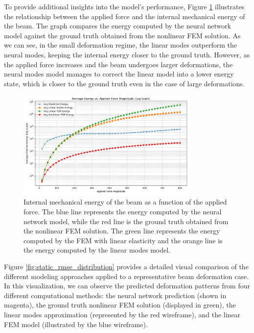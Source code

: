 To provide additional insights into the model's performance, Figure \ref{fig:static_energy_beam} illustrates the relationship between the applied force and the internal mechanical energy of the beam. The graph compares the energy computed by the neural network model against the ground truth obtained from the nonlinear FEM solution. As we can see, in the small deformation regime, the linear modes outperform the neural modes, keeping the internal energy closer  to the ground truth. However, as the applied force increases and the beam undergoes larger deformations, the neural modes model manages to correct the linear model into a lower energy state, which is closer to the ground truth even in the case of large deformations. 
\begin{figure}[H]
    \centering
    \includegraphics[width=0.8\textwidth]{Images/beam_static_energy.png}
    \caption{Internal mechanical energy of the beam as a function of the applied force. The blue line represents the energy computed by the neural network model, while the red line is the ground truth obtained from the nonlinear FEM solution. The green line represents the energy computed by the FEM with linear elasticity and the orange line is the energy computed by the linear modes model.}
    \label{fig:static_energy_beam}
\end{figure}


Figure \ref{fig:static_rmse_distribution} provides a detailed visual comparison of the different modeling approaches applied to a representative beam deformation case. In this visualization, we can observe the predicted deformation patterns from four different computational methods: the neural network prediction (shown in magenta), the ground truth nonlinear FEM solution (displayed in green), the linear modes approximation (represented by the red wireframe), and the linear FEM model (illustrated by the blue wireframe). 

